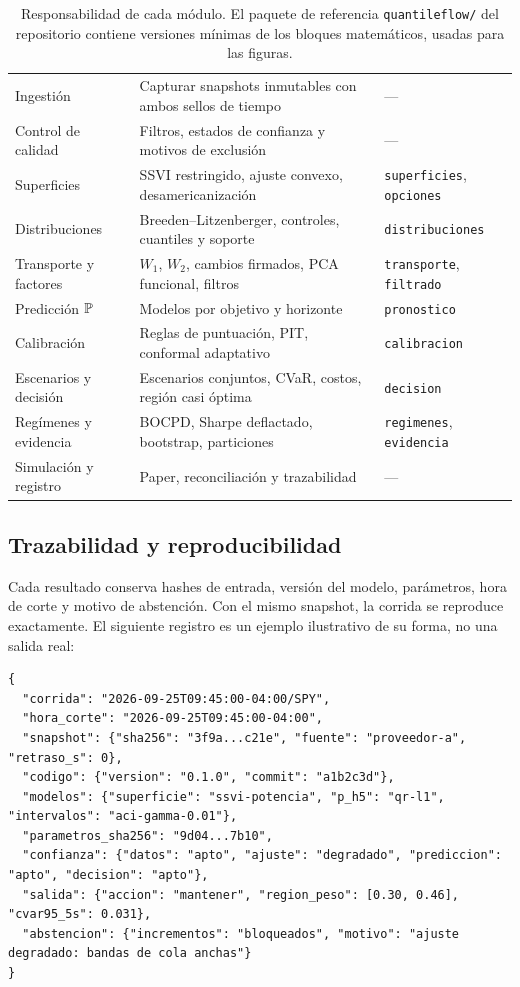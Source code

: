 \begin{table}[H]
\centering\small
\caption{Responsabilidad de cada módulo. El paquete de referencia \texttt{quantileflow/} del repositorio
contiene versiones mínimas de los bloques matemáticos, usadas para las figuras.}
\label{tab:modulos}
\begin{tabularx}{\linewidth}{@{}l Y l@{}}
\toprule
{} &  & \\
\midrule
Ingestión & Capturar snapshots inmutables con ambos sellos de tiempo & ---\\
Control de calidad & Filtros, estados de confianza y motivos de exclusión & ---\\
Superficies & SSVI restringido, ajuste convexo, desamericanización & \texttt{superficies}, \texttt{opciones}\\
Distribuciones & Breeden--Litzenberger, controles, cuantiles y soporte & \texttt{distribuciones}\\
Transporte y factores & $W_1$, $W_2$, cambios firmados, PCA funcional, filtros & \texttt{transporte}, \texttt{filtrado}\\
Predicción $\P$ & Modelos por objetivo y horizonte & \texttt{pronostico}\\
Calibración & Reglas de puntuación, PIT, conformal adaptativo & \texttt{calibracion}\\
Escenarios y decisión & Escenarios conjuntos, CVaR, costos, región casi óptima & \texttt{decision}\\
Regímenes y evidencia & BOCPD, Sharpe deflactado, bootstrap, particiones & \texttt{regimenes}, \texttt{evidencia}\\
Simulación y registro & Paper, reconciliación y trazabilidad & ---\\
\bottomrule
\end{tabularx}
\end{table}

\subsection{Trazabilidad y reproducibilidad}\label{sec:trazabilidad}

Cada resultado conserva hashes de entrada, versión del modelo, parámetros, hora de corte y motivo de
abstención. Con el mismo snapshot, la corrida se reproduce exactamente. El siguiente registro es un ejemplo
ilustrativo de su forma, no una salida real:

\begin{lstlisting}[style=registro]
{
  "corrida": "2026-09-25T09:45:00-04:00/SPY",
  "hora_corte": "2026-09-25T09:45:00-04:00",
  "snapshot": {"sha256": "3f9a...c21e", "fuente": "proveedor-a", "retraso_s": 0},
  "codigo": {"version": "0.1.0", "commit": "a1b2c3d"},
  "modelos": {"superficie": "ssvi-potencia", "p_h5": "qr-l1", "intervalos": "aci-gamma-0.01"},
  "parametros_sha256": "9d04...7b10",
  "confianza": {"datos": "apto", "ajuste": "degradado", "prediccion": "apto", "decision": "apto"},
  "salida": {"accion": "mantener", "region_peso": [0.30, 0.46], "cvar95_5s": 0.031},
  "abstencion": {"incrementos": "bloqueados", "motivo": "ajuste degradado: bandas de cola anchas"}
}
\end{lstlisting}

